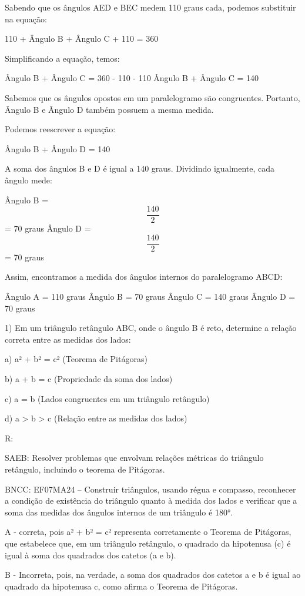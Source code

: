 Sabendo que os ângulos AED e BEC medem 110 graus cada, podemos
substituir na equação:

110 + Ângulo B + Ângulo C + 110 = 360

Simplificando a equação, temos:

Ângulo B + Ângulo C = 360 - 110 - 110 Ângulo B + Ângulo C = 140

Sabemos que os ângulos opostos em um paralelogramo são congruentes.
Portanto, Ângulo B e Ângulo D também possuem a mesma medida.

Podemos reescrever a equação:

Ângulo B + Ângulo D = 140

A soma dos ângulos B e D é igual a 140 graus. Dividindo igualmente, cada
ângulo mede:

Ângulo B = \[\frac {140}{2}\] = 70 graus Ângulo D = \[\frac {140}{2}\] =
70 graus

Assim, encontramos a medida dos ângulos internos do paralelogramo ABCD:

Ângulo A = 110 graus Ângulo B = 70 graus Ângulo C = 140 graus Ângulo D =
70 graus


1) Em um triângulo retângulo ABC, onde o ângulo B é reto, determine a
relação correta entre as medidas dos lados:

a) a² + b² = c² (Teorema de Pitágoras)

b) a + b = c (Propriedade da soma dos lados)

c) a = b (Lados congruentes em um triângulo retângulo)

d) a \textgreater{} b \textgreater{} c (Relação entre as medidas dos
lados)

R:

SAEB: Resolver problemas que envolvam relações métricas do triângulo
retângulo, incluindo o teorema de Pitágoras.

BNCC: EF07MA24 -- Construir triângulos, usando régua e compasso,
reconhecer a condição de existência do triângulo quanto à medida dos
lados e verificar que a soma das medidas dos ângulos internos de um
triângulo é 180°.

A - correta, pois a² + b² = c² representa corretamente o Teorema de
Pitágoras, que estabelece que, em um triângulo retângulo, o quadrado da
hipotenusa (c) é igual à soma dos quadrados dos catetos (a e b).

B - Incorreta, pois, na verdade, a soma dos quadrados dos catetos a e b
é igual ao quadrado da hipotenusa c, como afirma o Teorema de Pitágoras.

